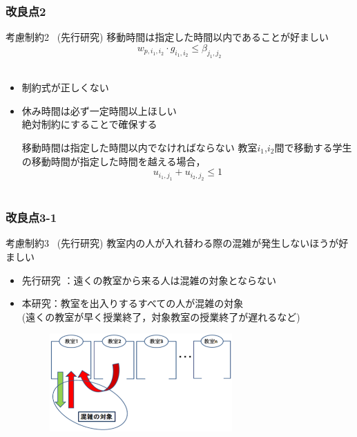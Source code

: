 \documentclass[dvipdfmx,12pt]{beamer}
\begin{document}
\begin{frame}\frametitle{改良点2}
\vspace{-6pt}
\begin{itembox}[l]{考慮制約2 \ (先行研究)}
\vspace{-5pt}
 移動時間は指定した時間以内であることが好ましい\\
\vspace{-15pt}
\[w_{p,i_1,i_2}\cdot g_{i_1,i_2} \leq \beta_{j_1,j_2}\]　\\
\vspace{-0.5in}
\end{itembox}
\begin{itemize}
\vspace{-5pt}
\item 制約式が正しくない\\

\item 休み時間は必ず一定時間以上ほしい\\
絶対制約にすることで確保する
\begin{block}{移動時間は指定した時間以内でなければならない}
教室$i_1$,$i_2$間で移動する学生の移動時間が指定した時間を越える場合，
\vspace{-10pt}
\[ u_{i_1,j_1}+u_{i_2,j_2}\le 1\]\\

\end{block}
\end{itemize}
\end{frame}




\begin{frame}\frametitle{改良点3-1}
\begin{itembox}[l]{考慮制約3 \ (先行研究)}
教室内の人が入れ替わる際の混雑が発生しないほうが好ましい\\
\vspace{-15pt}
\end{itembox}
\vspace{-15pt}
\begin{itemize}
\item 先行研究 ：遠くの教室から来る人は混雑の対象とならない\\
\item 本研究：教室を出入りするすべての人が混雑の対象\\
(遠くの教室が早く授業終了，対象教室の授業終了が遅れるなど)\\
\begin{figure}

		\includegraphics[width=7cm]{kouryo3_old8.eps}
	
\end{figure}
\end{itemize}
\end{frame}
\end{document}
